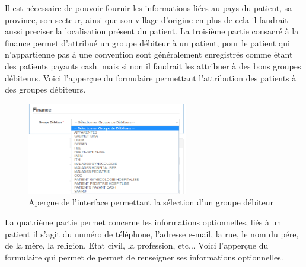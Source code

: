 \documentclass[12pt,a4paper]{report}
\begin{document}
Il est nécessaire de pouvoir fournir les informations liées au pays du patient, sa province, son secteur, ainsi que son village d'origine en plus de cela il faudrait aussi preciser la localisation présent du patient.
\newpage
La troisième partie consacré à la finance permet d'attribué un groupe débiteur à un patient, pour le patient qui n'appartienne pas à une convention sont généralement enregistrés comme étant des patients payants cash. mais si non il faudrait les attribuer à des bons groupes débiteurs. Voici l'apperçue du formulaire permettant l'attribution des patients à des groupes débiteurs.

\begin{figure}[h]
\begin{center}
\includegraphics[width=7cm]{pic/SelectGrDebiteur.png}
\end{center}
\caption{Aperçue de l'interface permettant la sélection d'un groupe débiteur}
\label{Aperçue de l'interface permettant la sélection d'un groupe débiteur}
\end{figure} 
 
La quatrième partie permet concerne les informations optionnelles, liés à un patient il s'agit du numéro de téléphone, l'adresse e-mail, la rue, le nom du pére, de la mère, la religion, Etat civil, la profession, etc...
Voici l'apperçue du formulaire qui permet de permet de renseigner ses informations optionnelles.
\end{document}
